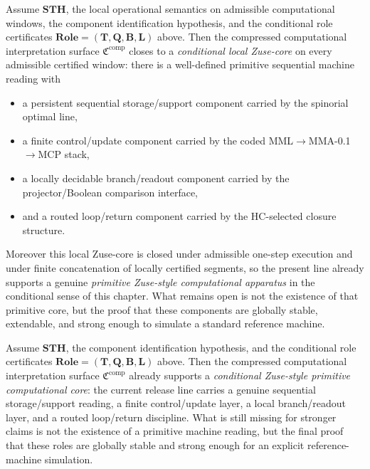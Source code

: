 \begin{theorem}
Assume $\mathbf{STH}$, the local operational semantics on admissible computational windows, the component identification hypothesis, and the conditional role certificates $\mathbf{Role}=(\mathbf T,\mathbf Q,\mathbf B,\mathbf L)$ above. Then the compressed computational interpretation surface $\mathfrak C^{\mathrm{comp}}$ closes to a \emph{conditional local Zuse-core} on every admissible certified window: there is a well-defined primitive sequential machine reading with
\begin{itemize}[leftmargin=2em]
  \item a persistent sequential storage/support component carried by the spinorial optimal line,
  \item a finite control/update component carried by the coded MML$\to$MMA-0.1$\to$MCP stack,
  \item a locally decidable branch/readout component carried by the projector/Boolean comparison interface,
  \item and a routed loop/return component carried by the HC-selected closure structure.
\end{itemize}
Moreover this local Zuse-core is closed under admissible one-step execution and under finite concatenation of locally certified segments, so the present line already supports a genuine \emph{primitive Zuse-style computational apparatus} in the conditional sense of this chapter. What remains open is not the existence of that primitive core, but the proof that these components are globally stable, extendable, and strong enough to simulate a standard reference machine.
\end{theorem}

\begin{corollary}
Assume $\mathbf{STH}$, the component identification hypothesis, and the conditional role certificates $\mathbf{Role}=(\mathbf T,\mathbf Q,\mathbf B,\mathbf L)$ above. Then the compressed computational interpretation surface $\mathfrak C^{\mathrm{comp}}$ already supports a \emph{conditional Zuse-style primitive computational core}: the current release line carries a genuine sequential storage/support reading, a finite control/update layer, a local branch/readout layer, and a routed loop/return discipline. What is still missing for stronger claims is not the existence of a primitive machine reading, but the final proof that these roles are globally stable and strong enough for an explicit reference-machine simulation.
\end{corollary}


